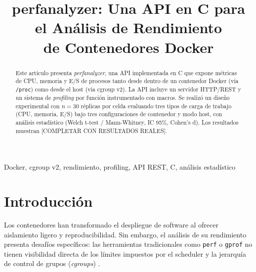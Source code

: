 \documentclass[conference]{IEEEtran}
\begin{document}
\title{perfanalyzer: Una API en C para el Análisis de Rendimiento\\
de Contenedores Docker}

\author{
  \and
}

\maketitle

\begin{abstract}
Este artículo presenta \textit{perfanalyzer}, una API implementada en C que
expone métricas de CPU, memoria y E/S de procesos tanto desde dentro de un
contenedor Docker (vía \texttt{/proc}) como desde el host (vía cgroup v2). La
API incluye un servidor HTTP/REST y un sistema de \textit{profiling} por función
instrumentado con macros. Se realizó un diseño experimental con $n=30$ réplicas
por celda evaluando tres tipos de carga de trabajo (CPU, memoria, E/S) bajo
tres configuraciones de contenedor y modo host, con análisis estadístico
(Welch t-test / Mann-Whitney, IC 95\%, Cohen's d). Los resultados muestran
[COMPLETAR CON RESULTADOS REALES].
\end{abstract}

\begin{IEEEkeywords}
Docker, cgroup v2, rendimiento, profiling, API REST, C, análisis estadístico
\end{IEEEkeywords}

\section{Introducción}

Los contenedores han transformado el despliegue de software al ofrecer
aislamiento ligero y reproducibilidad. Sin embargo, el análisis de su
rendimiento presenta desafíos específicos: las herramientas tradicionales
como \texttt{perf} o \texttt{gprof} no tienen visibilidad directa de los
límites impuestos por el scheduler y la jerarquía de control de grupos
(\textit{cgroups}) \cite{sobieraj2024docker}.
\end{document}
